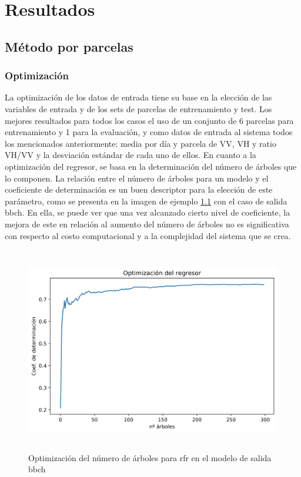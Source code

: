 
\chapter{Resultados}
\label{resultados}
\section{Método por parcelas}
\subsection{Optimización}
\par La optimización de los datos de entrada tiene su base en la elección de las variables de entrada y de los sets de parcelas de entrenamiento y test. Los mejores resultados para todos los casos el uso de un conjunto de 6 parcelas para entrenamiento y 1 para la evaluación, y como datos de entrada al sistema todos los mencionados anteriormente: media por día y parcela de VV, VH y ratio VH/VV y la desviación estándar de cada uno de ellos. En cuanto a la optimización del regresor, se basa en la determinación del número de árboles que lo componen. La relación entre el número de árboles para un modelo y el coeficiente de determinación es un buen descriptor para la elección de este parámetro, como se presenta en la imagen de ejemplo \ref{fig:opt_parcl} con el caso de salida \gls{bbch}. En ella, se puede ver que una vez alcanzado cierto nivel de coeficiente, la mejora de este en relación al aumento del número de árboles no es significativa con respecto al costo computacional y a la complejidad del sistema que se crea. 
\begin{figure}[h]
    \centering
    \includegraphics[height=9cm]{archivos/tfg/Mean/opt_tree_bbch_mean} 
    \caption{Optimización del número de árboles para \gls{rfr} en el modelo de salida \gls{bbch}\label{fig:opt_parcl}}
    
\end{figure}

